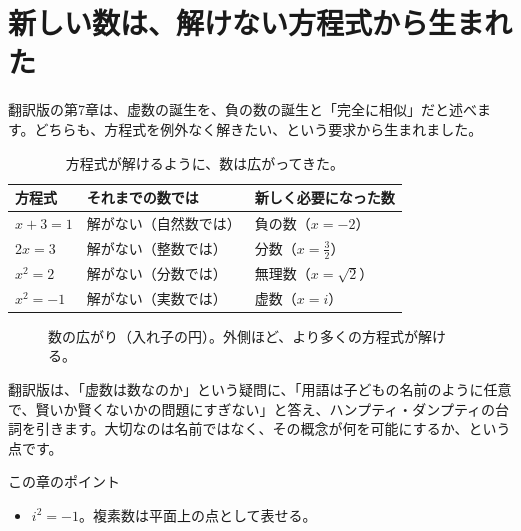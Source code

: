 \documentclass[a4paper,11pt,openany]{ltjsbook}
\begin{document}
\section{新しい数は、解けない方程式から生まれた}

翻訳版の第7章は、虚数の誕生を、負の数の誕生と「完全に相似」だと述べます。どちらも、方程式を例外なく解きたい、という要求から生まれました。

\begin{table}[htbp]
\centering
\begin{tabular}{lll}
\toprule
方程式 & それまでの数では & 新しく必要になった数\\
\midrule
$x+3=1$ & 解がない（自然数では） & 負の数（$x=-2$）\\
$2x=3$ & 解がない（整数では） & 分数（$x=\tfrac32$）\\
$x^2=2$ & 解がない（分数では） & 無理数（$x=\sqrt2$）\\
$x^2=-1$ & 解がない（実数では） & 虚数（$x=i$）\\
\bottomrule
\end{tabular}
\caption{方程式が解けるように、数は広がってきた。}
\end{table}

\begin{figure}[htbp]
\centering
{}
\caption{数の広がり（入れ子の円）。外側ほど、より多くの方程式が解ける。}
\end{figure}

翻訳版は、「虚数は数なのか」という疑問に、「用語は子どもの名前のように任意で、賢いか賢くないかの問題にすぎない」と答え、ハンプティ・ダンプティの台詞を引きます。大切なのは名前ではなく、その概念が何を可能にするか、という点です。

\begin{pointbox}{この章のポイント}
\begin{itemize}[leftmargin=1.5em]
\item $i^2=-1$。複素数は平面上の点として表せる。
\end{itemize}
\end{pointbox}
\end{document}
